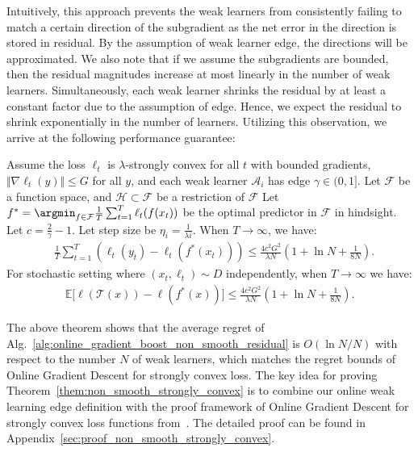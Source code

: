 Intuitively, this approach prevents the weak learners from consistently failing to match a certain direction of the subgradient as the net error in the direction is stored in residual. By the assumption of weak learner edge, the directions will be approximated. We also note that if we assume the subgradients are bounded, then the residual magnitudes increase at most linearly in the number of weak learners. Simultaneously, each weak learner shrinks the residual by at least a constant factor due to the assumption of edge. Hence, we expect the residual to shrink exponentially in the number of learners. Utilizing this observation, we arrive at the following performance guarantee:
\begin{theorem}
\label{them:non_smooth_strongly_convex}
Assume the loss
$\ell_t$ is $\lambda$-strongly convex for all $t$ with bounded gradients, $\Vert \nabla \ell_t(y) \Vert \leq G$ for all $y$, and each weak learner $\mathcal{A}_i$ has edge $\gamma\in(0,1]$. Let $\mathcal{F}$ be a function space, and $\mathcal{H} \subset \mathcal{F}$ be a restriction of $\mathcal{F}$ %
Let 
$f^* = \argmin _{f \in \mathcal{F}} \frac{1}{T} \sum _{t=1}^T \ell_t(f(x_t))$ be the 
optimal predictor in $\mathcal{F}$ in hindsight. Let $c = \frac{2}{\gamma} -1$. Let
step size be $\eta_i = \frac{1}{\lambda i}$. When $T\to \infty$, we have:
\begin{align}
&\frac{1}{T} \sum_{t=1}^T \left( \ell_t(y_t) - \ell_t(f^*(x_t)) \right) \leq \frac{4c^2G^2}{\lambda N} (1 + \ln N + \frac{1}{8N}). \label{eq:nonsmooth_result}
\end{align}
For stochastic setting where $(x_t, \ell_t)\sim D$ independently, when $T\to\infty$ we have:
\begin{align}
\label{eq:non_smooth_result_stoch}
\mathbb{E}\big[\ell(\mathcal{T}(x)) -  \ell(f^*(x)) \big]\leq \frac{4c^2G^2}{\lambda N} (1 + \ln N + \frac{1}{8N}).  \nonumber
\end{align}
\end{theorem}
The above theorem shows that the average regret of Alg.~\ref{alg:online_gradient_boost_non_smooth_residual} is $O(\ln N/N)$ with respect to the number $N$ of weak learners, which matches the regret bounds of Online Gradient Descent for strongly convex loss. 
The key idea for proving Theorem~\ref{them:non_smooth_strongly_convex} is to combine our online weak learning edge definition with the proof framework of Online Gradient Descent for strongly convex loss functions from~\citep{hazan2007logarithmic}. The detailed proof can be found in Appendix~\ref{sec:proof_non_smooth_strongly_convex}. 


